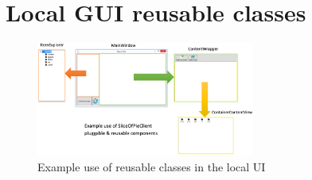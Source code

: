 \section{Local GUI reusable classes}
\label{sec:local-gui-reuse}

\begin{figure}[htb]
\centering
    \includegraphics[angle=90, width=0.64\textwidth]{Appendices/graphics/localuiplug&play.png}
    \caption{Example use of reusable classes in the local UI}
    \label{fig:local-gui-reuse-fig}
\end{figure}
